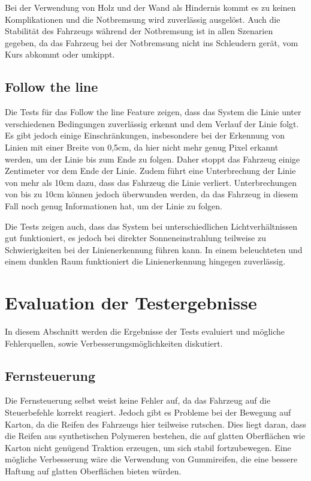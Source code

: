         Bei der Verwendung von Holz und der Wand als Hindernis kommt es zu keinen Komplikationen und die Notbremsung wird zuverlässig ausgelöst. Auch die Stabilität des Fahrzeugs während der Notbremsung ist in allen Szenarien gegeben, da das Fahrzeug bei der Notbremsung nicht ins Schleudern gerät, vom Kurs abkommt oder umkippt.

    \subsection{Follow the line}
    Die Tests für das Follow the line Feature zeigen, dass das System die Linie unter verschiedenen Bedingungen zuverlässig erkennt und dem Verlauf der Linie folgt. Es gibt jedoch einige Einschränkungen, insbesondere bei der Erkennung von Linien mit einer Breite von 0,5cm, da hier nicht mehr genug Pixel erkannt werden, um der Linie bis zum Ende zu folgen. Daher stoppt das Fahrzeug einige Zentimeter vor dem Ende der Linie. Zudem führt eine Unterbrechung der Linie von mehr als 10cm dazu, dass das Fahrzeug die Linie verliert. Unterbrechungen von bis zu 10cm können jedoch überwunden werden, da das Fahrzeug in diesem Fall noch genug Informationen hat, um der Linie zu folgen.

    Die Tests zeigen auch, dass das System bei unterschiedlichen Lichtverhältnissen gut funktioniert, es jedoch bei direkter Sonneneinstrahlung teilweise zu Schwierigkeiten bei der Linienerkennung führen kann. In einem beleuchteten und einem dunklen Raum funktioniert die Linienerkennung hingegen zuverlässig.

\section{Evaluation der Testergebnisse}
In diesem Abschnitt werden die Ergebnisse der Tests evaluiert und mögliche Fehlerquellen, sowie Verbesserungsmöglichkeiten diskutiert.

    \subsection{Fernsteuerung}
    Die Fernsteuerung selbst weist keine Fehler auf, da das Fahrzeug auf die Steuerbefehle korrekt reagiert. Jedoch gibt es Probleme bei der Bewegung auf Karton, da die Reifen des Fahrzeugs hier teilweise rutschen. Dies liegt daran, dass die Reifen aus synthetischen Polymeren bestehen, die auf glatten Oberflächen wie Karton nicht genügend Traktion erzeugen, um sich stabil fortzubewegen. Eine mögliche Verbesserung wäre die Verwendung von Gummireifen, die eine bessere Haftung auf glatten Oberflächen bieten würden.

